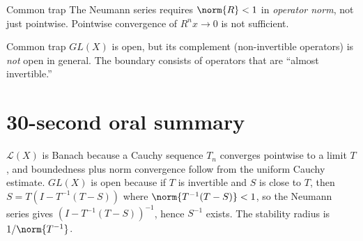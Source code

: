 \documentclass[11pt]{article}
\begin{document}
\begin{warningbox}{Common trap}
The Neumann series requires $\norm{R}<1$ in \emph{operator norm}, not just pointwise. Pointwise convergence of $R^n x\to 0$ is not sufficient.
\end{warningbox}

\begin{warningbox}{Common trap}
$GL(X)$ is open, but its complement (non-invertible operators) is \emph{not} open in general. The boundary consists of operators that are ``almost invertible.''
\end{warningbox}

\section{30-second oral summary}

\begin{summarybox}
$\mathcal L(X)$ is Banach because a Cauchy sequence $T_n$ converges pointwise to a limit $T$, and boundedness plus norm convergence follow from the uniform Cauchy estimate. $GL(X)$ is open because if $T$ is invertible and $S$ is close to $T$, then $S=T(I-T^{-1}(T-S))$ where $\norm{T^{-1}(T-S)}<1$, so the Neumann series gives $(I-T^{-1}(T-S))^{-1}$, hence $S^{-1}$ exists. The stability radius is $1/\norm{T^{-1}}$.
\end{summarybox}
\end{document}
